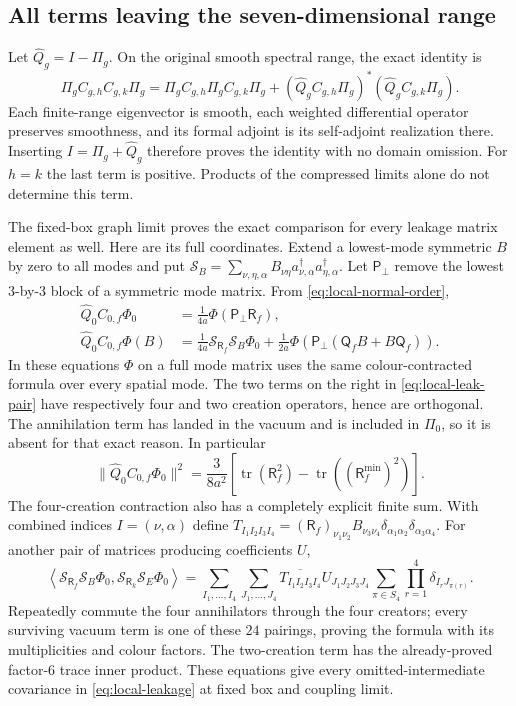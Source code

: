 \subsection{All terms leaving the seven-dimensional range}

Let $\widehat Q_g=I-\Pi_g$. On the original smooth spectral range,
the exact identity is
\begin{equation}\label{eq:local-leakage}
 \Pi_g C_{g,h}C_{g,k}\Pi_g
 =\Pi_gC_{g,h}\Pi_gC_{g,k}\Pi_g+
       (\widehat Q_gC_{g,h}\Pi_g)^*
                        (\widehat Q_gC_{g,k}\Pi_g).
\end{equation}
Each finite-range eigenvector is smooth, each weighted differential
operator preserves smoothness, and its formal adjoint is its
self-adjoint realization there. Inserting $I=\Pi_g+\widehat Q_g$
therefore proves the identity with no domain omission.
For $h=k$ the last term is positive. Products of the compressed
limits alone do not determine this term.

The fixed-box graph limit proves the exact comparison for every
leakage matrix element as well. Here are its full coordinates.
Extend a lowest-mode symmetric $B$ by zero to all modes and put
$\mathcal S_B= \sum_{\nu,\eta,\alpha}
B_{\nu\eta}a_{\nu,\alpha}^\dagger a_{\eta,\alpha}^\dagger$.
Let $\mathsf P_\perp$ remove the lowest $3$-by-$3$ block of a
symmetric mode matrix. From \eqref{eq:local-normal-order},
\begin{align}
 \widehat Q_0C_{0,f}\Phi_0
 &=\frac1{4a}\Phi(\mathsf P_\perp\mathsf R_f),
 \label{eq:local-leak-vac}\\
 \widehat Q_0C_{0,f}\Phi(B)
 &=\frac1{4a}\mathcal S_{\mathsf R_f}\mathcal S_B\Phi_0
 +\frac1{2a}
 \Phi\!\left(\mathsf P_\perp(\mathsf Q_fB+B\mathsf Q_f)\right).
 \label{eq:local-leak-pair}
\end{align}
In these equations $\Phi$ on a full mode matrix uses the same
colour-contracted formula over every spatial mode.
The two terms on the right in \eqref{eq:local-leak-pair} have
respectively four and two creation operators, hence are orthogonal.
The annihilation term has landed in the vacuum and is included in
$\Pi_0$, so it is absent for that exact reason.
In particular
\[
 \|\widehat Q_0C_{0,f}\Phi_0\|^2
 =\frac3{8a^2}\left[
 \operatorname{tr}(\mathsf R_f^2)
           -\operatorname{tr}((\mathsf R_f^{\min})^2)\right].
\]
The four-creation contraction also has a completely explicit finite
sum. With combined indices $I=(\nu,\alpha)$ define
$T_{I_1I_2I_3I_4}
=(\mathsf R_f)_{\nu_1\nu_2}B_{\nu_3\nu_4}
\delta_{\alpha_1\alpha_2}\delta_{\alpha_3\alpha_4}$.
For another pair of matrices producing coefficients $U$,
\[
 \left\langle\mathcal S_{\mathsf R_f}\mathcal S_B\Phi_0,
              \mathcal S_{\mathsf R_k}\mathcal S_E\Phi_0\right\rangle
 =\sum_{I_1,\ldots,I_4}\sum_{J_1,\ldots,J_4}
 \overline{T_{I_1I_2I_3I_4}}U_{J_1J_2J_3J_4}
 \sum_{\pi\in S_4}\prod_{r=1}^4\delta_{I_rJ_{\pi(r)}}.
\]
Repeatedly commute the four annihilators through the four creators;
every surviving vacuum term is one of these $24$ pairings, proving
the formula with its multiplicities and colour factors.
The two-creation term has the already-proved factor-$6$ trace
inner product. These equations give every omitted-intermediate
covariance in \eqref{eq:local-leakage} at fixed box and coupling limit.

